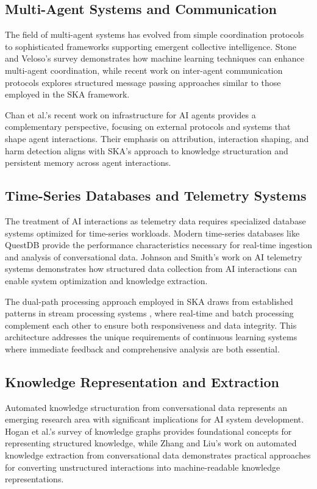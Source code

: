 \documentclass[11pt]{article}
\begin{document}
	\subsection{Multi-Agent Systems and Communication}
	The field of multi-agent systems has evolved from simple coordination protocols to sophisticated frameworks supporting emergent collective intelligence. Stone and Veloso's survey \cite{multiagent2023} demonstrates how machine learning techniques can enhance multi-agent coordination, while recent work on inter-agent communication protocols \cite{agentcomm2024} explores structured message passing approaches similar to those employed in the SKA framework.
	
	Chan et al.'s recent work on infrastructure for AI agents \cite{agentinfra2025} provides a complementary perspective, focusing on external protocols and systems that shape agent interactions. Their emphasis on attribution, interaction shaping, and harm detection aligns with SKA's approach to knowledge structuration and persistent memory across agent interactions.
	
	\subsection{Time-Series Databases and Telemetry Systems}
	The treatment of AI interactions as telemetry data requires specialized database systems optimized for time-series workloads. Modern time-series databases like QuestDB \cite{questdb2023} provide the performance characteristics necessary for real-time ingestion and analysis of conversational data. Johnson and Smith's work on AI telemetry systems \cite{telemetryai2024} demonstrates how structured data collection from AI interactions can enable system optimization and knowledge extraction.
	
	The dual-path processing approach employed in SKA draws from established patterns in stream processing systems \cite{streamprocessing2023}, where real-time and batch processing complement each other to ensure both responsiveness and data integrity. This architecture addresses the unique requirements of continuous learning systems where immediate feedback and comprehensive analysis are both essential.
	
	\subsection{Knowledge Representation and Extraction}
	Automated knowledge structuration from conversational data represents an emerging research area with significant implications for AI system development. Hogan et al.'s survey of knowledge graphs \cite{knowledgeextraction2023} provides foundational concepts for representing structured knowledge, while Zhang and Liu's work on automated knowledge extraction from conversational data \cite{structuredknowledge2024} demonstrates practical approaches for converting unstructured interactions into machine-readable knowledge representations.
	
\end{document}
